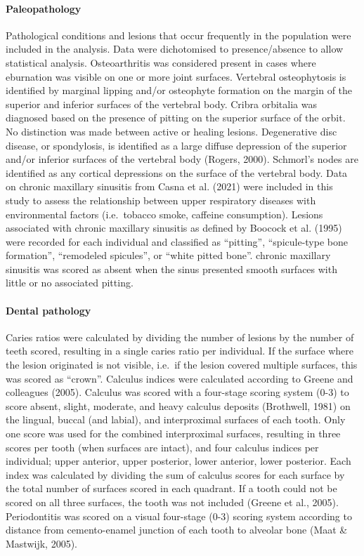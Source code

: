 \documentclass[
]{article}
\let\oldparagraph\paragraph
\renewcommand{\paragraph}[1]{\oldparagraph{#1}\mbox{}}
\begin{document}
\hypertarget{paleopathology}{%
\paragraph{Paleopathology}\label{paleopathology}}

Pathological conditions and lesions that occur frequently in the
population were included in the analysis. Data were dichotomised to
presence/absence to allow statistical analysis. Osteoarthritis was
considered present in cases where eburnation was visible on one or more
joint surfaces. Vertebral osteophytosis is identified by marginal
lipping and/or osteophyte formation on the margin of the superior and
inferior surfaces of the vertebral body. Cribra orbitalia was diagnosed
based on the presence of pitting on the superior surface of the orbit.
No distinction was made between active or healing lesions. Degenerative
disc disease, or spondylosis, is identified as a large diffuse
depression of the superior and/or inferior surfaces of the vertebral
body (Rogers, 2000). Schmorl's nodes are identified as any cortical
depressions on the surface of the vertebral body. Data on chronic
maxillary sinusitis from Casna et al. (2021) were included in this study
to assess the relationship between upper respiratory diseases with
environmental factors (i.e.~tobacco smoke, caffeine consumption).
Lesions associated with chronic maxillary sinusitis as defined by
Boocock et al. (1995) were recorded for each individual and classified
as ``pitting'', ``spicule-type bone formation'', ``remodeled spicules'',
or ``white pitted bone''. chronic maxillary sinusitis was scored as
absent when the sinus presented smooth surfaces with little or no
associated pitting.

\hypertarget{dental-pathology}{%
\paragraph{Dental pathology}\label{dental-pathology}}

Caries ratios were calculated by dividing the number of lesions by the
number of teeth scored, resulting in a single caries ratio per
individual. If the surface where the lesion originated is not visible,
i.e.~if the lesion covered multiple surfaces, this was scored as
``crown''. Calculus indices were calculated according to Greene and
colleagues (2005). Calculus was scored with a four-stage scoring system
(0-3) to score absent, slight, moderate, and heavy calculus deposits
(Brothwell, 1981) on the lingual, buccal (and labial), and interproximal
surfaces of each tooth. Only one score was used for the combined
interproximal surfaces, resulting in three scores per tooth (when
surfaces are intact), and four calculus indices per individual; upper
anterior, upper posterior, lower anterior, lower posterior. Each index
was calculated by dividing the sum of calculus scores for each surface
by the total number of surfaces scored in each quadrant. If a tooth
could not be scored on all three surfaces, the tooth was not included
(Greene et al., 2005). Periodontitis was scored on a visual four-stage
(0-3) scoring system according to distance from cemento-enamel junction
of each tooth to alveolar bone (Maat \& Mastwijk, 2005).
\end{document}
